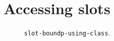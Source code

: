 \section{Accessing slots}



\begin{figure}
\begin{center}
\end{center}
\caption{\label{fig-slot-boundp-using-class}
\texttt{slot-boundp-using-class}.}
\end{figure}

